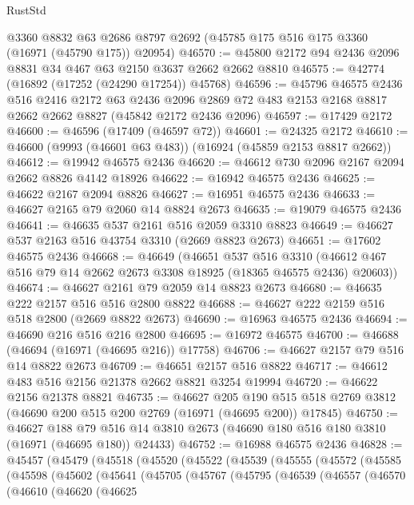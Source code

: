 \begin{lexlean}{RustStd}
\begin{coremodule}
    @3360
    @8832
    @63
    @2686
    @8797
    @2692
    (@45785 @175 @516 @175 @3360 (@16971 (@45790 @175)) @20954)
@46570 := @45800 @2172 @94 @2436 @2096 @8831 @34 @467 @63 @2150 @3637 @2662 @2662 @8810
@46575 := @42774 (@16892 (@17252 (@24290 @17254)) @45768)
@46596 := @45796
    @46575
    @2436
    @516
    @2416
    @2172
    @63
    @2436
    @2096
    @2869
    @72
    @483
    @2153
    @2168
    @8817
    @2662
    @2662
    @8827
    (@45842 @2172 @2436 @2096)
@46597 := @17429 @2172
@46600 := @46596 (@17409 (@46597 @72))
@46601 := @24325 @2172
@46610 := @46600 (@9993 (@46601 @63 @483)) (@16924 (@45859 @2153 @8817 @2662))
@46612 := @19942 @46575 @2436
@46620 := @46612 @730 @2096 @2167 @2094 @2662 @8826 @4142 @18926
@46622 := @16942 @46575 @2436
@46625 := @46622 @2167 @2094 @8826
@46627 := @16951 @46575 @2436
@46633 := @46627 @2165 @79 @2060 @14 @8824 @2673
@46635 := @19079 @46575 @2436
@46641 := @46635 @537 @2161 @516 @2059 @3310 @8823
@46649 := @46627 @537 @2163 @516 @43754 @3310 (@2669 @8823 @2673)
@46651 := @17602 @46575 @2436
@46668 := @46649
    (@46651
      @537
      @516
      @3310
      (@46612 @467 @516 @79 @14 @2662 @2673 @3308 @18925 (@18365 @46575 @2436) @20603))
@46674 := @46627 @2161 @79 @2059 @14 @8823 @2673
@46680 := @46635 @222 @2157 @516 @516 @2800 @8822
@46688 := @46627 @222 @2159 @516 @518 @2800 (@2669 @8822 @2673)
@46690 := @16963 @46575 @2436
@46694 := @46690 @216 @516 @216 @2800
@46695 := @16972 @46575
@46700 := @46688 (@46694 (@16971 (@46695 @216)) @17758)
@46706 := @46627 @2157 @79 @516 @14 @8822 @2673
@46709 := @46651 @2157 @516 @8822
@46717 := @46612 @483 @516 @2156 @21378 @2662 @8821 @3254 @19994
@46720 := @46622 @2156 @21378 @8821
@46735 := @46627
    @205
    @190
    @515
    @518
    @2769
    @3812
    (@46690 @200 @515 @200 @2769 (@16971 (@46695 @200)) @17845)
@46750 := @46627
    @188
    @79
    @516
    @14
    @3810
    @2673
    (@46690 @180 @516 @180 @3810 (@16971 (@46695 @180)) @24433)
@46752 := @16988 @46575 @2436
@46828 := @45457
    (@45479
      (@45518
        (@45520
          (@45522
            (@45539
              (@45555
                (@45572
                  (@45585
                    (@45598
                      (@45602
                        (@45641
                          (@45705
                            (@45767
                              (@45795
                                (@46539
                                  (@46557
                                    (@46570
                                      (@46610
                                        (@46620
                                          (@46625

\end{coremodule}
\end{lexlean}
